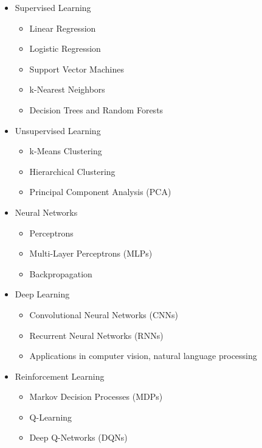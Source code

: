{\begin{highlight}[\CSPBML]
        \begin{itemize}
            \item Supervised Learning
            \begin{itemize}
                \item Linear Regression
                \item Logistic Regression
                \item Support Vector Machines
                \item k-Nearest Neighbors
                \item Decision Trees and Random Forests
            \end{itemize}
            \item Unsupervised Learning
            \begin{itemize}
                \item k-Means Clustering
                \item Hierarchical Clustering
                \item Principal Component Analysis (PCA)
            \end{itemize}
            \item Neural Networks
            \begin{itemize}
                \item Perceptrons
                \item Multi-Layer Perceptrons (MLPs)
                \item Backpropagation
            \end{itemize}
            \item Deep Learning
            \begin{itemize}
                \item Convolutional Neural Networks (CNNs)
                \item Recurrent Neural Networks (RNNs)
                \item Applications in computer vision, natural language processing
            \end{itemize}
            \item Reinforcement Learning
            \begin{itemize}
                \item Markov Decision Processes (MDPs)
                \item Q-Learning
                \item Deep Q-Networks (DQNs)
            \end{itemize}
        \end{itemize}
        

\end{highlight}}
